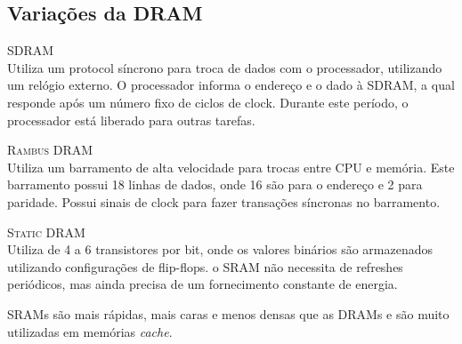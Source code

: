 \subsection{Variações da DRAM}

\textsc{SDRAM}\\
Utiliza um protocol síncrono para troca de dados com o processador, utilizando um relógio externo. O processador informa o endereço e o dado à SDRAM, a qual responde após um número fixo de ciclos de clock. Durante este período, o processador está liberado para outras tarefas.

\textsc{Rambus DRAM}\\
Utiliza um barramento de alta velocidade para trocas entre CPU e memória. Este barramento possui 18 linhas de dados, onde 16 são para o endereço e 2 para paridade. Possui sinais de clock para fazer transações síncronas no barramento.

\textsc{Static DRAM}\\
Utiliza de 4 a 6 transistores por bit, onde os valores binários são armazenados utilizando configurações de flip-flops. o SRAM não necessita de refreshes periódicos, mas ainda precisa de um fornecimento constante de energia.

SRAMs são mais rápidas, mais caras e menos densas que as DRAMs e são muito utilizadas em memórias \textit{cache}.

